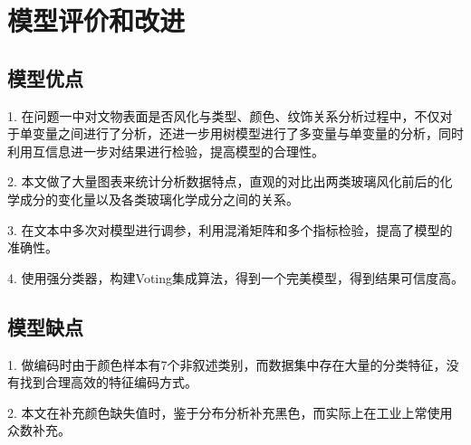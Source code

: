 \section{模型评价和改进}

\subsection{模型优点}

1. 在问题一中对文物表面是否风化与类型、颜色、纹饰关系分析过程中，不仅对于单变量之间进行了分析，还进一步用树模型进行了多变量与单变量的分析，同时利用互信息进一步对结果进行检验，提高模型的合理性。

2. 本文做了大量图表来统计分析数据特点，直观的对比出两类玻璃风化前后的化学成分的变化量以及各类玻璃化学成分之间的关系。

3. 在文本中多次对模型进行调参，利用混淆矩阵和多个指标检验，提高了模型的准确性。

4. 使用强分类器，构建Voting集成算法，得到一个完美模型，得到结果可信度高。

\subsection{模型缺点}

1. 做编码时由于颜色样本有7个非叙述类别，而数据集中存在大量的分类特征，没有找到合理高效的特征编码方式。

2. 本文在补充颜色缺失值时，鉴于分布分析补充黑色，而实际上在工业上常使用众数补充。


